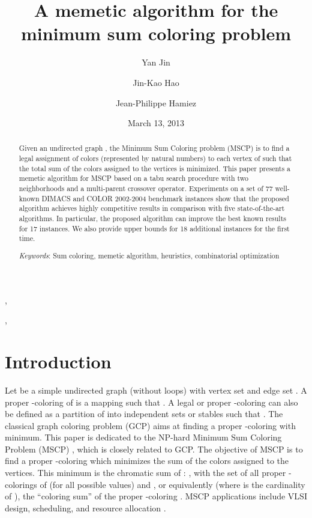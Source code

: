 \documentclass{elsart}
\begin{document}
\begin{frontmatter}

\title{A memetic algorithm for the minimum sum coloring problem}
\author{Yan Jin},
\author{Jin-Kao Hao},
 
\author{Jean-Philippe Hamiez}

\address {LERIA, Universit\'{e} d'Angers, 2 Boulevard Lavoisier, 49045 Angers, France}

\date{March 13, 2013}


\maketitle

\begin{abstract}
Given an undirected graph , the Minimum Sum Coloring problem (MSCP) is to find a legal assignment of colors (represented by natural numbers) to each vertex of  such that the total sum of the colors assigned to the vertices is minimized. This paper presents a memetic algorithm for MSCP based on a tabu search procedure with two neighborhoods and a multi-parent crossover operator. Experiments on a set of 77 well-known DIMACS and COLOR 2002-2004 benchmark instances show that the proposed algorithm achieves highly competitive results in comparison with five state-of-the-art algorithms. In particular, the proposed algorithm can improve the best known results for 17 instances. We also provide upper bounds for 18 additional instances for the first time.

\emph{Keywords}: Sum coloring, memetic algorithm, heuristics, combinatorial optimization
\end{abstract}

\end{frontmatter}

\section{Introduction}
\label{Sec_Intro}


Let  be a simple undirected graph (without loops) with vertex set  and edge set . A proper -coloring  of  is a mapping  such that . A legal or proper -coloring can also be defined as a partition of  into  independent sets or stables  such that  . The classical graph coloring problem (GCP) aims at finding a proper -coloring with  minimum. 
This paper is dedicated to the NP-hard Minimum Sum Coloring Problem (MSCP) \cite{KubickaPhD1989,Kubicka&Schwenk1989}, which is closely related to GCP. The objective of MSCP is to find a proper -coloring which minimizes the sum of the colors assigned to the vertices. This minimum is the chromatic sum  of : , with  the set of all proper -colorings of  (for all possible  values) and , or  equivalently (where  is the cardinality of ), the ``coloring sum'' of the proper -coloring . MSCP applications include VLSI design, scheduling, and resource allocation \cite{Malafiejski2004}.
\end{document}
